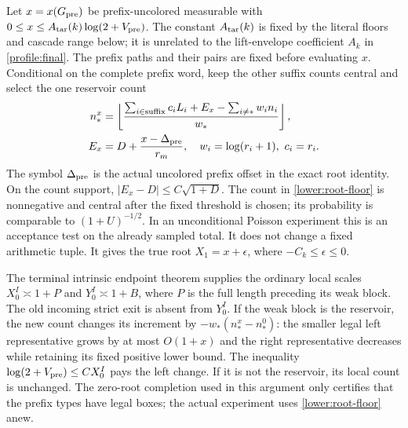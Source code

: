 Let $x=x(G_{\rm pre})$ be prefix-uncolored measurable with
$0\leq x\leq A_{\rm tar}(k)\log(2+V_{\rm pre})$.  The constant $A_{\rm tar}(k)$ is fixed by the literal floors and
cascade range below; it is unrelated to the lift-envelope coefficient
$A_k$ in \eqref{profile:final}.  The prefix paths and their
pairs are fixed before evaluating $x$.  Conditional on the complete
prefix word, keep the other suffix counts central and select the one
reservoir count
\begin{align}
 n_*^x&=\left\lfloor
 \frac{\sum_{i\in\mathrm{suffix}}c_iL_i+E_x
                    -\sum_{i\ne *}w_in_i}{w_*}\right\rfloor,\notag\\
 E_x&=D+\frac{x-\Delta_{\rm pre}}{r_m},
 \quad w_i=\log(r_i+1),\ c_i=r_i.
 \label{lower:root-floor}
\end{align}
The symbol $\Delta_{\rm pre}$ is the actual uncolored prefix offset
in the exact root identity.  On the count support,
$|E_x-D|\leq C\sqrt{1+D}$.  The count in
\eqref{lower:root-floor} is nonnegative and central after the fixed
threshold is chosen; its probability is comparable to
$(1+U)^{-1/2}$.  In an unconditional Poisson experiment this is an
acceptance test on the already sampled total.  It does not change a
fixed arithmetic tuple.  It gives the true root
$X_1=x+\epsilon$, where $-C_k\leq\epsilon\leq0$.

The terminal intrinsic endpoint theorem supplies the ordinary local
scales $X_0^I\asymp1+P$ and $Y_0^I\asymp1+B$, where $P$ is the full
length preceding its weak block.  The old incoming strict exit is
absent from $Y_0^I$.  If the weak block is the reservoir, the new count
changes its increment by $-w_*(n_*^x-n_*^0)$: the smaller legal left
representative grows by at most $O(1+x)$ and the right representative
decreases while retaining its fixed positive lower bound.  The
inequality $\log(2+V_{\rm pre})\leq C X_0^I$ pays the left change.
If it is not the reservoir, its local count is unchanged.
The zero-root completion used in this argument only certifies that
the prefix types have legal boxes; the actual experiment uses
\eqref{lower:root-floor} anew.

